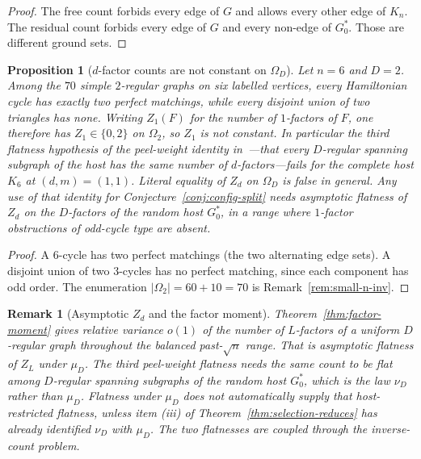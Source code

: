 \documentclass[11pt]{article}
\newtheorem{proposition}[theorem]{Proposition}
\newtheorem{remark}[theorem]{Remark}
\begin{document}
\begin{proof}
The free count forbids every edge of \(G\) and allows every other edge of
\(K_n\).
The residual count forbids every edge of \(G\) and every non-edge of
\(G^*_0\).
Those are different ground sets.
\end{proof}

\begin{proposition}[\(d\)-factor counts are not constant on \(\Omega_D\)]
\label{prop:zd-not-flat}
Let \(n=6\) and \(D=2\). Among the \(70\) simple \(2\)-regular graphs on six
labelled vertices, every Hamiltonian cycle has exactly two perfect matchings,
while every disjoint union of two triangles has none.
Writing \(Z_1(F)\) for the number of \(1\)-factors of \(F\), one therefore has
\(Z_1\in\{0,2\}\) on \(\Omega_2\), so \(Z_1\) is not constant.
In particular the third flatness hypothesis of the peel-weight identity
in~\cite{PlusOneV1}---that every \(D\)-regular spanning subgraph of the host
has the same number of \(d\)-factors---fails for the complete host \(K_6\) at
\((d,m)=(1,1)\).
Literal equality of \(Z_d\) on \(\Omega_D\) is false in general.
Any use of that identity for Conjecture~\ref{conj:config-split} needs
asymptotic flatness of \(Z_d\) on the \(D\)-factors of the random host
\(G^*_0\), in a range where \(1\)-factor obstructions of odd-cycle type are
absent.
\end{proposition}

\begin{proof}
A \(6\)-cycle has two perfect matchings (the two alternating edge sets).
A disjoint union of two \(3\)-cycles has no perfect matching, since each
component has odd order.
The enumeration \(\lvert\Omega_2\rvert=60+10=70\) is Remark~\ref{rem:small-n-inv}.
\end{proof}

\begin{remark}[Asymptotic \(Z_d\) and the factor moment]
\label{rem:zd-vs-factor}
Theorem~\ref{thm:factor-moment} gives relative variance \(o(1)\) of the
number of \(L\)-factors of a uniform \(D\)-regular graph throughout the
balanced past-\(\sqrt{n}\) range.
That is asymptotic flatness of \(Z_L\) under \(\mu_D\).
The third peel-weight flatness needs the same count to be flat among
\(D\)-regular spanning subgraphs of the random host \(G^*_0\), which is the
law \(\nu_D\) rather than \(\mu_D\).
Flatness under \(\mu_D\) does not automatically supply that host-restricted
flatness, unless item (iii) of Theorem~\ref{thm:selection-reduces} has
already identified \(\nu_D\) with \(\mu_D\).
The two flatnesses are coupled through the inverse-count problem.
\end{remark}
\end{document}
